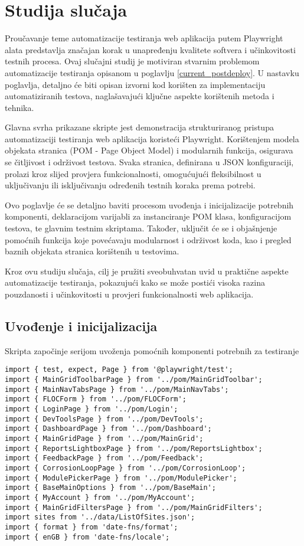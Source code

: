 \chapter{Studija slučaja}\label{ch:implementacija}

Proučavanje teme automatizacije testiranja web aplikacija putem Playwright alata predstavlja značajan korak u unapređenju kvalitete softvera i učinkovitosti testnih procesa.
Ovaj slučajni studij je motiviran stvarnim problemom automatizacije testiranja opisanom u poglavlju \ref{current_postdeploy}.
U nastavku poglavlja, detaljno će biti opisan izvorni kod korišten za implementaciju automatiziranih testova, naglašavajući ključne aspekte korištenih metoda i tehnika.

Glavna svrha prikazane skripte jest demonstracija strukturiranog pristupa automatizaciji testiranja web aplikacija koristeći Playwright.
Korištenjem modela objekata stranica (POM - Page Object Model) i modularnih funkcija, osigurava se čitljivost i održivost testova. 
Svaka stranica, definirana u JSON konfiguraciji, prolazi kroz slijed provjera funkcionalnosti, omogućujući fleksibilnost u uključivanju ili isključivanju određenih testnih koraka prema potrebi.

Ovo poglavlje će se detaljno baviti procesom uvođenja i inicijalizacije potrebnih komponenti, deklaracijom varijabli za instanciranje POM klasa, konfiguracijom testova, te glavnim testnim skriptama. 
Također, uključit će se i objašnjenje pomoćnih funkcija koje povećavaju modularnost i održivost koda, kao i pregled baznih objekata stranica korištenih u testovima.

Kroz ovu studiju slučaja, cilj je pružiti sveobuhvatan uvid u praktične aspekte automatizacije testiranja, pokazujući kako se može postići visoka razina pouzdanosti i učinkovitosti u provjeri funkcionalnosti web aplikacija.


\section{Uvođenje i inicijalizacija}
Skripta započinje serijom uvoženja pomoćnih komponenti potrebnih za testiranje
\begin{verbatim}
import { test, expect, Page } from '@playwright/test';
import { MainGridToolbarPage } from '../pom/MainGridToolbar';
import { MainNavTabsPage } from '../pom/MainNavTabs';
import { FLOCForm } from '../pom/FLOCForm';
import { LoginPage } from '../pom/Login';
import { DevToolsPage } from '../pom/DevTools';
import { DashboardPage } from '../pom/Dashboard';
import { MainGridPage } from '../pom/MainGrid';
import { ReportsLightboxPage } from '../pom/ReportsLightbox';
import { FeedbackPage } from '../pom/Feedback';
import { CorrosionLoopPage } from '../pom/CorrosionLoop';
import { ModulePickerPage } from '../pom/ModulePicker';
import { BaseMainOptions } from '../pom/BaseMain';
import { MyAccount } from '../pom/MyAccount';
import { MainGridFiltersPage } from '../pom/MainGridFilters';
import sites from '../data/ListOfSites.json';
import { format } from 'date-fns/format';
import { enGB } from 'date-fns/locale';
\end{verbatim}

